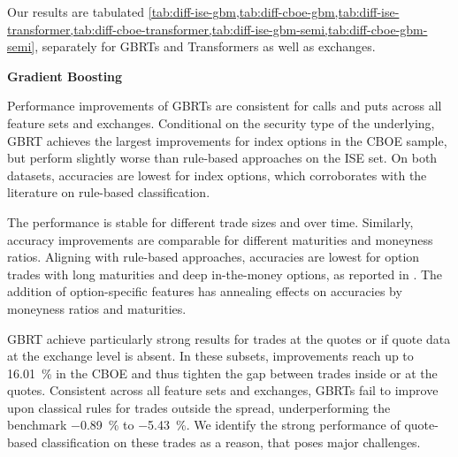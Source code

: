 Our results are tabulated \cref{tab:diff-ise-gbm,tab:diff-cboe-gbm,tab:diff-ise-transformer,tab:diff-cboe-transformer,tab:diff-ise-gbm-semi,tab:diff-cboe-gbm-semi}, separately for \glspl{GBRT} and Transformers as well as exchanges.

\textbf{Gradient Boosting}

Performance improvements of \glspl{GBRT} are consistent for calls and puts across all feature sets and exchanges. Conditional on the security type of the underlying, \gls{GBRT} achieves the largest improvements for index options in the \gls{CBOE} sample, but perform slightly worse than rule-based approaches on the \gls{ISE} set. On both datasets, accuracies are lowest for index options, which corroborates with the literature on rule-based classification.

The performance is stable for different trade sizes and over time. Similarly, accuracy improvements are comparable for different maturities and moneyness ratios. Aligning with rule-based approaches, accuracies are lowest for option trades with long maturities and deep in-the-money options, as reported in \textcite[][22]{grauerOptionTradeClassification2022}. The addition of option-specific features has annealing effects on accuracies by moneyness ratios and maturities.

\gls{GBRT} achieve particularly strong results for trades at the quotes or if quote data at the exchange level is absent. In these subsets, improvements reach up to \SI{16.01}{\percent} in the \gls{CBOE} and thus tighten the gap between trades inside or at the quotes. Consistent across all feature sets and exchanges, \glspl{GBRT} fail to improve upon classical rules for trades outside the spread, underperforming the benchmark \SI{-0.89}{\percent} to \SI{-5.43}{\percent}. We identify the strong performance of quote-based classification on these trades as a reason, that poses major challenges.

